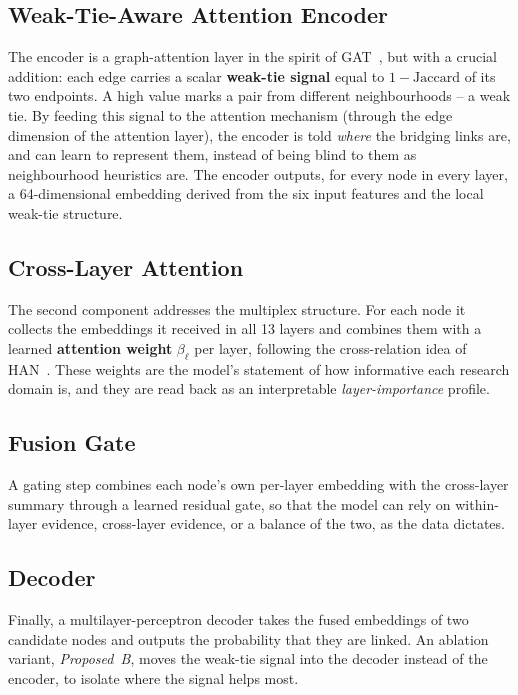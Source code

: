 \subsection{Weak-Tie-Aware Attention Encoder}
The encoder is a graph-attention layer in the spirit of GAT~\cite{gat}, but with a crucial addition:
each edge carries a scalar \textbf{weak-tie signal} equal to $1-\text{Jaccard}$ of its two endpoints.
A high value marks a pair from different neighbourhoods -- a weak tie. By feeding this signal to the
attention mechanism (through the edge dimension of the attention layer), the encoder is told
\emph{where} the bridging links are, and can learn to represent them, instead of being blind to them
as neighbourhood heuristics are. The encoder outputs, for every node in every layer, a 64-dimensional
embedding derived from the six input features and the local weak-tie structure.

\subsection{Cross-Layer Attention}
The second component addresses the multiplex structure. For each node it collects the embeddings it
received in all 13 layers and combines them with a learned \textbf{attention weight}
$\beta_\ell$ per layer, following the cross-relation idea of HAN~\cite{han2019}. These weights are the
model's statement of how informative each research domain is, and they are read back as an
interpretable \emph{layer-importance} profile.

\subsection{Fusion Gate}
A gating step combines each node's own per-layer embedding with the cross-layer summary through a
learned residual gate, so that the model can rely on within-layer evidence, cross-layer evidence, or
a balance of the two, as the data dictates.

\subsection{Decoder}
Finally, a multilayer-perceptron decoder takes the fused embeddings of two candidate nodes and
outputs the probability that they are linked. An ablation variant, \emph{Proposed~B}, moves the
weak-tie signal into the decoder instead of the encoder, to isolate where the signal helps most.


